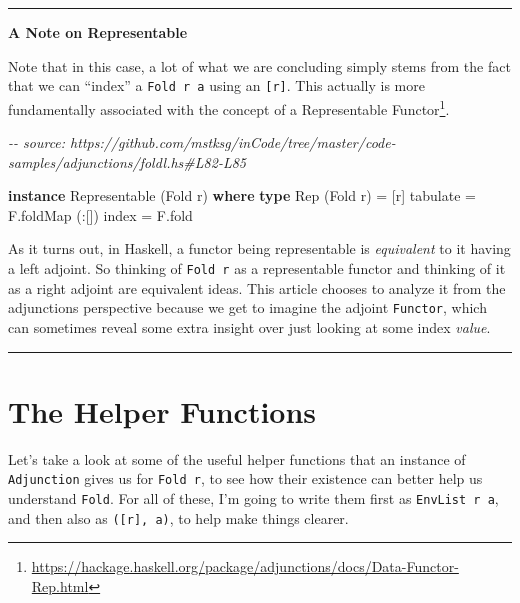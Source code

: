\documentclass[]{article}
\newenvironment{Shaded}{}{}
\newcommand{\CommentTok}[1]{\textcolor[rgb]{0.38,0.63,0.69}{\textit{#1}}}
\newcommand{\DataTypeTok}[1]{\textcolor[rgb]{0.56,0.13,0.00}{#1}}
\newcommand{\FunctionTok}[1]{\textcolor[rgb]{0.02,0.16,0.49}{#1}}
\newcommand{\KeywordTok}[1]{\textcolor[rgb]{0.00,0.44,0.13}{\textbf{#1}}}
\newcommand{\NormalTok}[1]{#1}
\newcommand{\OperatorTok}[1]{\textcolor[rgb]{0.40,0.40,0.40}{#1}}
\newcommand{\OtherTok}[1]{\textcolor[rgb]{0.00,0.44,0.13}{#1}}
\renewcommand{\href}[2]{#2\footnote{\url{#1}}}
\begin{document}
\begin{center}\rule{0.5\linewidth}{\linethickness}\end{center}

\textbf{A Note on Representable}

Note that in this case, a lot of what we are concluding simply stems from the
fact that we can ``index'' a \texttt{Fold\ r\ a} using an \texttt{{[}r{]}}. This
actually is more fundamentally associated with the concept of a
\href{https://hackage.haskell.org/package/adjunctions/docs/Data-Functor-Rep.html}{Representable
Functor}.

\begin{Shaded}
\begin{Highlighting}[]
\CommentTok{{-}{-} source: https://github.com/mstksg/inCode/tree/master/code{-}samples/adjunctions/foldl.hs\#L82{-}L85}

\KeywordTok{instance} \DataTypeTok{Representable}\NormalTok{ (}\DataTypeTok{Fold}\NormalTok{ r) }\KeywordTok{where}
    \KeywordTok{type} \DataTypeTok{Rep}\NormalTok{ (}\DataTypeTok{Fold}\NormalTok{ r) }\OtherTok{=}\NormalTok{ [r]}
\NormalTok{    tabulate }\OtherTok{=}\NormalTok{ F.foldMap (}\OperatorTok{:}\NormalTok{[])}
    \FunctionTok{index}    \OtherTok{=}\NormalTok{ F.fold}
\end{Highlighting}
\end{Shaded}

As it turns out, in Haskell, a functor being representable is \emph{equivalent}
to it having a left adjoint. So thinking of \texttt{Fold\ r} as a representable
functor and thinking of it as a right adjoint are equivalent ideas. This article
chooses to analyze it from the adjunctions perspective because we get to imagine
the adjoint \texttt{Functor}, which can sometimes reveal some extra insight over
just looking at some index \emph{value}.

\begin{center}\rule{0.5\linewidth}{\linethickness}\end{center}

\hypertarget{the-helper-functions}{%
\section{The Helper Functions}\label{the-helper-functions}}

Let's take a look at some of the useful helper functions that an instance of
\texttt{Adjunction} gives us for \texttt{Fold\ r}, to see how their existence
can better help us understand \texttt{Fold}. For all of these, I'm going to
write them first as \texttt{EnvList\ r\ a}, and then also as
\texttt{({[}r{]},\ a)}, to help make things clearer.
\end{document}
